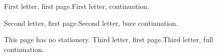 \documentclass[a4paper]{seasonalletter}
\begin{document}
\begin{SeasonalLetter}[season=spring]
First letter, first page.\newpage First letter, continuation.
\end{SeasonalLetter}
\begin{SeasonalLetter}[theme=cold]
Second letter, first page.\newpage Second letter, bare continuation.
\end{SeasonalLetter}
This page has no stationery.\clearpage
{}
\SeasonalReset
Third letter, first page.\newpage Third letter, full continuation.
\end{document}
